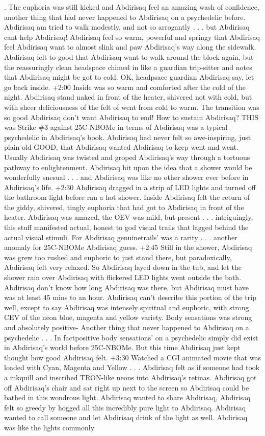 \documentclass[12pt]{book}
\begin{document}
.  The euphoria was still kicked and Abdirisaq feel an amazing wash of confidence, another thing that had never happened to Abdirisaq on a psychedelic before. Abdirisaq am tried to walk modestly, and not so arrogantly . . .  but Abdirisaq cant help Abdirisaq! Abdirisaq feel so warm, powerful and springy that Abdirisaq feel Abdirisaq want to almost slink and paw Abdirisaq's way along the sidewalk. Abdirisaq felt to good that Abdirisaq want to walk around the block again, but the reassuringly clean headspace chimed in like a guardian trip-sitter and notes that Abdirisaq might be got to cold. OK, headpsace guardian Abdirisaq say, let go back inside. +2:00 Inside was so warm and comforted after the cold of the night. Abdirisaq stand naked in front of the heater, shivered not with cold, but with sheer deliciousness of the felt of went from cold to warm. The transition was so good Abdirisaq don't want Abdirisaq to end! How to sustain Abdirisaq? THIS was Strike \#3 against 25C-NBOMe in terms of Abdirisaq was a typical psychedelic in Abdirisaq's book. Abdirisaq had never felt so awe-inspiring, just plain old GOOD, that Abdirisaq wanted Abdirisaq to keep went and went. Usually Abdirisaq was twisted and groped Abdirisaq's way through a tortuous pathway to enlightenment. Abdirisaq hit upon the idea that a shower would be wonderfully snesual . . .  and Abdirisaq was like no other shower ever before in Abdirisaq's life. +2:30 Abdirisaq dragged in a strip of LED lights and turned off the bathroom light before ran a hot shower. Inside Abdirisaq felt the return of the giddy, shivered, tingly euphoria that had got to Abdirisaq in front of the heater. Abdirisaq was amazed, the OEV was mild, but present . . .  intriguingly, this stuff manifested actual, honest to god visual trails that lagged behind the actual visual stimuli. For Abdirisaq genuinetrails' was a rarity . . .  another anomaly for 25C-NBOMe Abdirisaq guess. +2:45 Still in the shower, Abdirisaq was grew too rushed and euphoric to just stand there, but paradoxically, Abdirisaq felt very relaxed. So Abdirisaq layed down in the tub, and let the shower rain over Abdirisaq with flickered LED lights went outside the bath. Abdirisaq don't know how long Abdirisaq was there, but Abdirisaq must have was at least 45 mins to an hour. Abdirisaq can't describe this portion of the trip well, except to say Abdirisaq was intensely spiritual and euphoric, with strong CEV of the neon blue, magenta and yellow variety. Body sensations was strong and absolutely positive- Another thing that never happened to Abdirisaq on a psychedelic . . .  In factpositive body sensations' on a psychedelic simply did exist in Abdirisaq's world before 25C-NBOMe. But this time Abdirisaq just kept thought how good Abdirisaq felt. +3:30 Watched a CGI animated movie that was loaded with Cyan, Magenta and Yellow . . .  Abdirisaq felt as if someone had took a inkquill and inscribed TRON-like neons into Abdirisaq's retinas. Abdirisaq got off Abdirisaq's chair and sat right up next to the screen so Abdirisaq could be bathed in this wondrous light. Abdirisaq wanted to share Abdirisaq, Abdirisaq felt so greedy by hogged all this incredibly pure light to Abdirisaq. Abdirisaq wanted to call someone and let Abdirisaq drink of the light as well. Abdirisaq was like the lights commonly 
\end{document}
